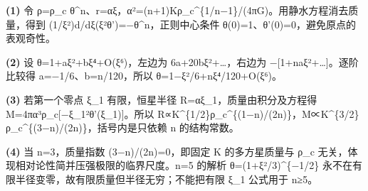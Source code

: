 \par\noindent\textbf{(1)} 令 ρ=ρ\_c θ\textasciicircum{}n、r=αξ，α²=(n+1)Kρ\_c\textasciicircum{}\{1/n−1\}/(4πG)。用静水方程消去质量，得到 (1/ξ²)d/dξ(ξ²θ')=−θ\textasciicircum{}n，正则中心条件 θ(0)=1、θ'(0)=0，避免原点的表观奇性。
\par\noindent\textbf{(2)} 设 θ=1+aξ²+bξ⁴+O(ξ⁶)，左边为 6a+20bξ²+…，右边为 −[1+naξ²+…]。逐阶比较得 a=−1/6、b=n/120，所以 θ=1−ξ²/6+nξ⁴/120+O(ξ⁶)。
\par\noindent\textbf{(3)} 若第一个零点 ξ\_1 有限，恒星半径 R=αξ\_1，质量由积分及方程得 M=4πα³ρ\_c[−ξ\_1²θ'(ξ\_1)]。所以 R∝K\textasciicircum{}\{1/2\}ρ\_c\textasciicircum{}\{(1−n)/(2n)\}，M∝K\textasciicircum{}\{3/2\}ρ\_c\textasciicircum{}\{(3−n)/(2n)\}，括号内是只依赖 n 的结构常数。
\par\noindent\textbf{(4)} 当 n=3，质量指数 (3−n)/(2n)=0，即固定 K 的多方星质量与 ρ\_c 无关，体现相对论性简并压强极限的临界尺度。n=5 的解析 θ=(1+ξ²/3)\textasciicircum{}\{−1/2\} 永不在有限半径变零，故有限质量但半径无穷；不能把有限 ξ\_1 公式用于 n≥5。
